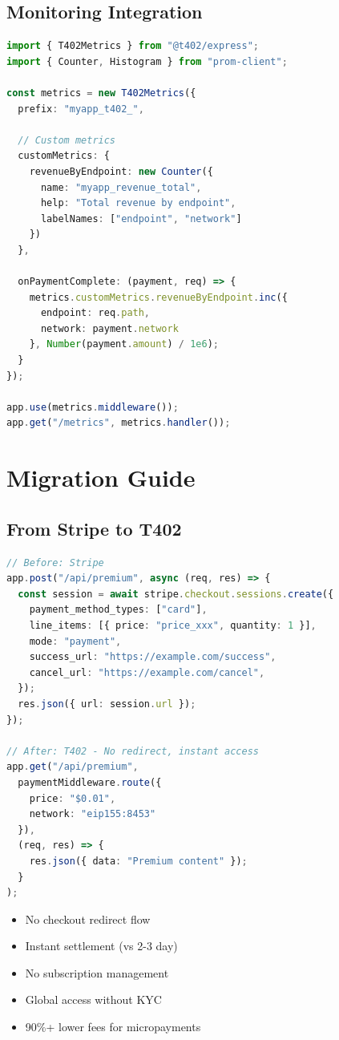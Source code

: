 \subsection{Monitoring Integration}

\begin{lstlisting}[language=typescript,caption={Metrics and monitoring}]
import { T402Metrics } from "@t402/express";
import { Counter, Histogram } from "prom-client";

const metrics = new T402Metrics({
  prefix: "myapp_t402_",

  // Custom metrics
  customMetrics: {
    revenueByEndpoint: new Counter({
      name: "myapp_revenue_total",
      help: "Total revenue by endpoint",
      labelNames: ["endpoint", "network"]
    })
  },

  onPaymentComplete: (payment, req) => {
    metrics.customMetrics.revenueByEndpoint.inc({
      endpoint: req.path,
      network: payment.network
    }, Number(payment.amount) / 1e6);
  }
});

app.use(metrics.middleware());
app.get("/metrics", metrics.handler());
\end{lstlisting}

\section{Migration Guide}
\label{sec:migration}

\subsection{From Stripe to T402}

\begin{lstlisting}[language=typescript,caption={Migration from Stripe}]
// Before: Stripe
app.post("/api/premium", async (req, res) => {
  const session = await stripe.checkout.sessions.create({
    payment_method_types: ["card"],
    line_items: [{ price: "price_xxx", quantity: 1 }],
    mode: "payment",
    success_url: "https://example.com/success",
    cancel_url: "https://example.com/cancel",
  });
  res.json({ url: session.url });
});

// After: T402 - No redirect, instant access
app.get("/api/premium",
  paymentMiddleware.route({
    price: "$0.01",
    network: "eip155:8453"
  }),
  (req, res) => {
    res.json({ data: "Premium content" });
  }
);
\end{lstlisting}

\begin{infobox}
\begin{itemize}
    \item No checkout redirect flow
    \item Instant settlement (vs 2-3 day)
    \item No subscription management
    \item Global access without KYC
    \item 90\%+ lower fees for micropayments
\end{itemize}
\end{infobox}

